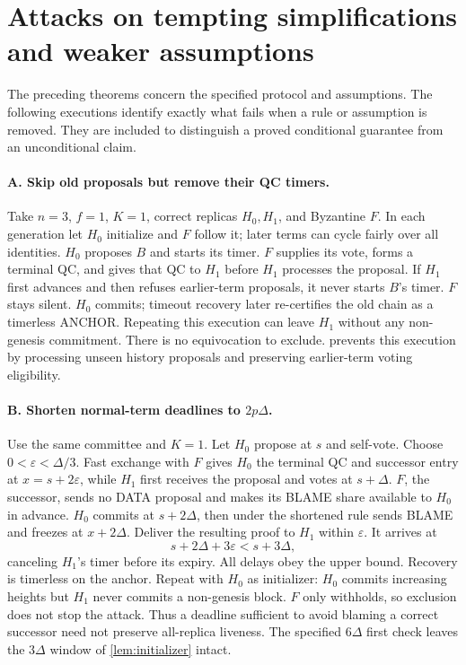 \documentclass[11pt,a4paper]{article}
\newcounter{protocol}
\begin{document}
\section{Attacks on tempting simplifications and weaker assumptions}
\label{sec:attacks}
The preceding theorems concern the specified protocol and assumptions.
The following executions identify exactly what fails when a rule or
assumption is removed. They are included to distinguish a proved conditional
guarantee from an unconditional claim.

\paragraph{A. Skip old proposals but remove their QC timers.}
Take $n=3$, $f=1$, $K=1$, correct replicas $H_0,H_1$, and Byzantine $F$.
In each generation let $H_0$ initialize and $F$ follow it; later terms
can cycle fairly over all identities. $H_0$ proposes $B$ and starts its
timer. $F$ supplies its vote, forms a terminal QC, and gives that QC to
$H_1$ before $H_1$ processes the proposal. If $H_1$ first advances and
then refuses earlier-term proposals, it never starts $B$'s timer.
$F$ stays silent. $H_0$ commits; timeout recovery later re-certifies the
old chain as a timerless ANCHOR. Repeating this execution can leave $H_1$
without any non-genesis commitment. There is no equivocation to exclude.
 prevents this execution by processing unseen history
proposals and preserving earlier-term voting eligibility.

\paragraph{B. Shorten normal-term deadlines to $2p\Delta$.}
Use the same committee and $K=1$. Let $H_0$ propose at $s$ and self-vote.
Choose $0<\varepsilon<\Delta/3$. Fast exchange with $F$ gives $H_0$ the
terminal QC and successor entry at $x=s+2\varepsilon$, while $H_1$ first
receives the proposal and votes at $s+\Delta$. $F$, the successor, sends
no DATA proposal and makes its BLAME share available to $H_0$ in advance.
$H_0$ commits at $s+2\Delta$, then under the shortened rule sends BLAME
and freezes at $x+2\Delta$. Deliver the resulting proof to $H_1$ within
$\varepsilon$. It arrives at
\[
 s+2\Delta+3\varepsilon<s+3\Delta,
\]
canceling $H_1$'s timer before its expiry. All delays obey the upper bound.
Recovery is timerless on the anchor. Repeat with $H_0$ as initializer:
$H_0$ commits increasing heights but $H_1$ never commits a non-genesis
block. $F$ only withholds, so exclusion does not stop the attack.
Thus a deadline sufficient to avoid blaming a correct successor need not
preserve all-replica liveness. The specified $6\Delta$ first check leaves
the $3\Delta$ window of \cref{lem:initializer} intact.
\end{document}
